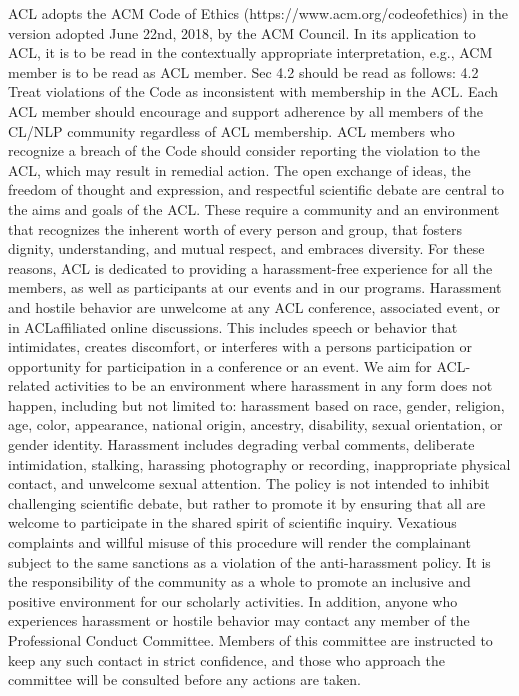 ACL adopts the ACM Code of Ethics (https://www.acm.org/code\-of\-ethics) in the version adopted June 22nd, 2018, by the ACM Council. 
In its application to ACL, it is to be read in the contextually appropriate interpretation, e.g., ACM member is to be read as ACL member. Sec 4.2 should be read as follows: 4.2 Treat violations of the Code as inconsistent with membership in the ACL. Each ACL member should encourage and support adherence by all members of the CL/NLP community regardless of ACL membership. ACL members who recognize a breach of the Code should consider reporting the violation to the ACL, which may result in remedial action.
The open exchange of ideas, the freedom of thought and expression, and respectful scientific debate are central to the aims and goals of the ACL. These require a community and an environment that recognizes the inherent worth of every person and group, that fosters dignity, understanding, and mutual respect, and embraces diversity. For these reasons, ACL is dedicated to providing a harassment-free experience for all the members, as well as participants at our events and in our programs. Harassment and hostile behavior are unwelcome at any ACL conference, associated event, or in ACLaffiliated online discussions. This includes speech or behavior that intimidates, creates discomfort, or interferes with a persons participation or opportunity for participation in a conference or an event. We aim for ACL-related activities to be an environment where harassment in any form does not happen, including but not limited to: harassment based on race, gender, religion, age, color, appearance, national origin, ancestry, disability, sexual orientation, or gender identity. Harassment includes degrading verbal comments, deliberate intimidation, stalking, harassing photography or recording, inappropriate physical contact, and unwelcome sexual attention. The policy is not intended to inhibit challenging scientific debate, but rather to promote it by ensuring that all are welcome to participate in the shared spirit of scientific inquiry. Vexatious complaints and willful misuse of this procedure will render the complainant subject to the same sanctions as a violation of the anti-harassment policy. It is the responsibility of the community as a whole to promote an inclusive and positive environment for our scholarly activities. In addition, anyone who experiences harassment or hostile behavior may contact any member of the Professional Conduct Committee. Members of this committee are instructed to keep any such contact in strict confidence, and those who approach the committee will be consulted before any actions are taken.
